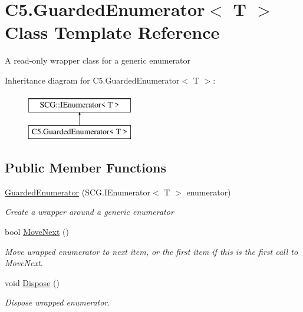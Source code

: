 \hypertarget{class_c5_1_1_guarded_enumerator}{}\section{C5.\+Guarded\+Enumerator$<$ T $>$ Class Template Reference}
\label{class_c5_1_1_guarded_enumerator}


A read-\/only wrapper class for a generic enumerator  


Inheritance diagram for C5.\+Guarded\+Enumerator$<$ T $>$\+:\begin{figure}[H]
\begin{center}
\leavevmode
\includegraphics[height=2.000000cm]{class_c5_1_1_guarded_enumerator}
\end{center}
\end{figure}
\subsection*{Public Member Functions}
\begin{DoxyCompactItemize}
\item 
\hyperlink{class_c5_1_1_guarded_enumerator_a26e05b27464a89352253e1a683c0750a}{Guarded\+Enumerator} (S\+C\+G.\+I\+Enumerator$<$ T $>$ enumerator)
\begin{DoxyCompactList}\small\item\em Create a wrapper around a generic enumerator \end{DoxyCompactList}\item 
bool \hyperlink{class_c5_1_1_guarded_enumerator_a2fad3f14e61f9fa762730de1ab42d68d}{Move\+Next} ()
\begin{DoxyCompactList}\small\item\em Move wrapped enumerator to next item, or the first item if this is the first call to Move\+Next. \end{DoxyCompactList}\item 
void \hyperlink{class_c5_1_1_guarded_enumerator_a2733fc78a530e8212dc160b9a6aa395f}{Dispose} ()
\begin{DoxyCompactList}\small\item\em Dispose wrapped enumerator. \end{DoxyCompactList}\end{DoxyCompactItemize}
